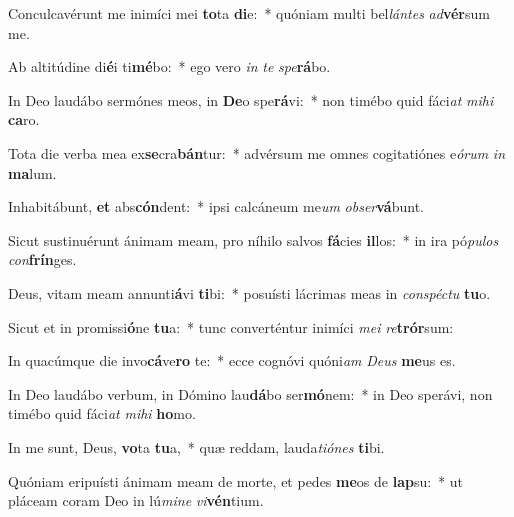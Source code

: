 \item Conculcavérunt me inimíci mei \textbf{to}ta \textbf{di}e:~* quóniam multi bel\textit{lán}\textit{tes} \textit{ad}\textbf{vér}sum me.
\item Ab altitúdine di\textbf{é}i ti\textbf{mé}bo:~* ego vero \textit{in} \textit{te} \textit{spe}\textbf{rá}bo.
\item In Deo laudábo sermónes meos, in \textbf{De}o spe\textbf{rá}vi:~* non timébo quid fáci\textit{at} \textit{mi}\textit{hi} \textbf{ca}ro.
\item Tota die verba mea ex\textbf{se}cra\textbf{bán}tur:~* advérsum me omnes cogitatiónes e\textit{ó}\textit{rum} \textit{in} \textbf{ma}lum.
\item Inhabitábunt, \textbf{et} abs\textbf{cón}dent:~* ipsi calcáneum me\textit{um} \textit{ob}\textit{ser}\textbf{vá}bunt.
\item Sicut sustinuérunt ánimam meam, pro níhilo salvos \textbf{fá}cies \textbf{il}los:~* in ira pó\textit{pu}\textit{los} \textit{con}\textbf{frín}ges.
\item Deus, vitam meam annunti\textbf{á}vi \textbf{ti}bi:~* posuísti lácrimas meas in \textit{con}\textit{spéc}\textit{tu} \textbf{tu}o.
\item Sicut et in promissi\textbf{ó}ne \textbf{tu}a:~* tunc converténtur inimíci \textit{me}\textit{i} \textit{re}\textbf{trór}sum:
\item In quacúmque die invo\textbf{cá}ve\textbf{ro} te:~* ecce cognóvi quóni\textit{am} \textit{De}\textit{us} \textbf{me}us es.
\item In Deo laudábo verbum, in Dómino lau\textbf{dá}bo ser\textbf{mó}nem:~* in Deo sperávi, non timébo quid fáci\textit{at} \textit{mi}\textit{hi} \textbf{ho}mo.
\item In me sunt, Deus, \textbf{vo}ta \textbf{tu}a,~* quæ reddam, lauda\textit{ti}\textit{ó}\textit{nes} \textbf{ti}bi.
\item Quóniam eripuísti ánimam meam de morte, et pedes \textbf{me}os de \textbf{lap}su:~* ut pláceam coram Deo in lú\textit{mi}\textit{ne} \textit{vi}\textbf{vén}tium.

